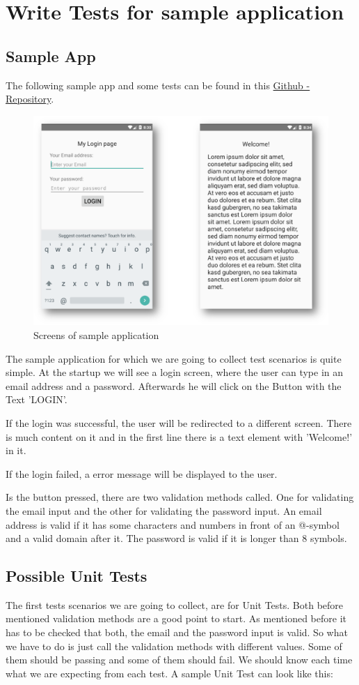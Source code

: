 	\chapter{Write Tests for sample application}
	\section{Sample App}
	The following sample app and some tests can be found in this \href{https://github.com/RedTo/AndroidTesting}{Github - Repository}.
	\begin{figure}[H]
		\centering
		\includegraphics[width=0.7\linewidth]{images/sample_app}
		\caption{Screens of sample application}
		\label{fig:sampleapp}
	\end{figure}
	The sample application for which we are going to collect test scenarios is quite simple. At the startup we will see a login screen, where the user can type in an email address and a password. Afterwards he will click on the Button with the Text 'LOGIN'.
	
	If the login was successful, the user will be redirected to a different screen. There is much content on it and in the first line there is a text element with 'Welcome!' in it.
	
	If the login failed, a error message will be displayed to the user.
	
	Is the button pressed, there are two validation methods called. One for validating the email input and the other for validating the password input. An email address is valid if it has some characters and numbers in front of an @-symbol and a valid domain after it. The password is valid if it is longer than 8 symbols.
	
	\section{Possible Unit Tests}
	The first tests scenarios we are going to collect, are for Unit Tests. Both before mentioned validation methods are a good point to start. As mentioned before it has to be checked that both, the email and the password input is valid. So what we have to do is just call the validation methods with different values. Some of them should be passing and some of them should fail. We should know each time what we are expecting from each test. A sample Unit Test can look like this:\\
	
